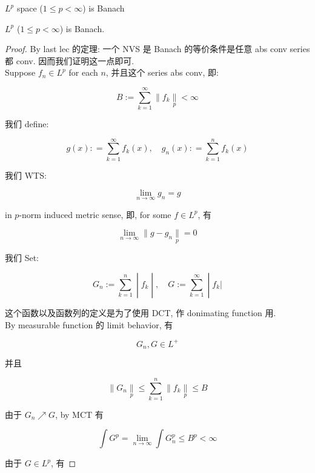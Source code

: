 \documentclass{qlnotes-export}
\begin{document}
\begin{theorem}{\(L^{p}\) space (\(1 \leq p < \infty\)) is Banach}\label{thm-09-l-p-space-and-inequalities-l-p-space-1-leq-p-infty-is-banach}

\(L^{p}\) (\(1 \leq p < \infty\)) is Banach.

\end{theorem}

\begin{proof}

By last lec 的定理: 一个 NVS 是 Banach 的等价条件是任意 abs conv series 都 conv. 因而我们证明这一点即可.\\
Suppose \(f_{n} \in L^{p}\) for each \(n\), 并且这个 series abs conv, 即:

\[B := \sum\limits_{k = 1}^{\infty} \parallel f_{k}\underset{p}{\parallel} < \infty\]

我们 define:

\[g(x): = \sum\limits_{k = 1}^{\infty}f_{k}(x),\quad g_{n}(x): = \sum\limits_{k = 1}^{n}f_{k}(x)\]

我们 WTS:

\[\lim\limits_{n\rightarrow\infty}g_{n} = g\]

in \(p\)-norm induced metric sense, 即, for some \(f \in L^{p}\), 有

\[\lim\limits_{n\rightarrow\infty} \parallel g - g_{n}\underset{p}{\parallel} = 0\]

我们 Set:

\[\left. G_{n} := \sum\limits_{k = 1}^{n} \middle| f_{k} \middle| ,\quad G := \sum\limits_{k = 1}^{\infty} \middle| f_{k}| \right.\]

这个函数以及函数列的定义是为了使用 DCT, 作 donimating function 用.\\
By measurable function 的 limit behavior, 有

\[G_{n},G \in L^{+}\]

并且

\[\parallel G_{n}\underset{p}{\parallel} \leq \sum\limits_{k = 1}^{n} \parallel f_{k}\underset{p}{\parallel} \leq B\]

由于 \(G_{n}\operatorname{\nearrow ︎}G\), by MCT 有

\[\int G^{p} = \lim\limits_{n\rightarrow\infty}\int G_{n}^{p} \leq B^{p} < \infty\]

由于 \(G \in L^{p}\), 有


\end{proof}
\end{document}
